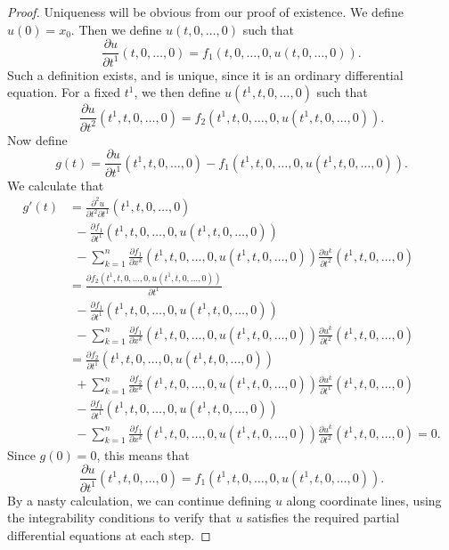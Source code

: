 \begin{proof}
    Uniqueness will be obvious from our proof of existence. We define $u(0) = x_0$. Then we define $u(t,0,\dots,0)$ such that
    \[ \frac{\partial u}{\partial t^1}(t,0,\dots,0) = f_1(t,0,\dots,0,u(t,0,\dots,0)). \]
    Such a definition exists, and is unique, since it is an ordinary differential equation. For a fixed $t^1$, we then define $u(t^1,t,0,\dots,0)$ such that
    \[ \frac{\partial u}{\partial t^2}(t^1,t,0,\dots,0) = f_2(t^1,t,0,\dots,0,u(t^1,t,0,\dots,0)). \]
    Now define
    \[ g(t) = \frac{\partial u}{\partial t^1}(t^1,t,0,\dots,0) - f_1(t^1,t,0,\dots,0,u(t^1,t,0,\dots,0)). \]
    We calculate that
    \begin{align*}
        g'(t) &= \frac{\partial^2 u}{\partial t^2 \partial t^1}(t^1,t,0,\dots,0)\\
        &\ \ - \frac{\partial f_1}{\partial t^1}(t^1,t,0,\dots,0,u(t^1,t,0,\dots,0))\\
        &\ \ - \sum_{k = 1}^n \frac{\partial f_1}{\partial x^k}(t^1,t,0,\dots,0,u(t^1,t,0,\dots,0)) \frac{\partial u^k}{\partial t^2}(t^1,t,0,\dots,0)\\
        &= \frac{\partial f_2(t^1,t,0,\dots,0,u(t^1,t,0,\dots,0))}{\partial t^1}\\
        &\ \ - \frac{\partial f_1}{\partial t^1}(t^1,t,0,\dots,0,u(t^1,t,0,\dots,0))\\
        &\ \ - \sum_{k = 1}^n \frac{\partial f_1}{\partial x^k}(t^1,t,0,\dots,0,u(t^1,t,0,\dots,0)) \frac{\partial u^k}{\partial t^2}(t^1,t,0,\dots,0)\\
        &= \frac{\partial f_2}{\partial t^1}(t^1,t,0,\dots,0,u(t^1,t,0,\dots,0))\\
        &\ \ + \sum_{k = 1}^n \frac{\partial f_2}{\partial x^k}(t^1,t,0,\dots,0,u(t^1,t,0,\dots,0)) \frac{\partial u^k}{\partial t^1}(t^1,t,0,\dots,0)\\
        &\ \ - \frac{\partial f_1}{\partial t^1}(t^1,t,0,\dots,0,u(t^1,t,0,\dots,0))\\
        &\ \ - \sum_{k = 1}^n \frac{\partial f_1}{\partial x^k}(t^1,t,0,\dots,0,u(t^1,t,0,\dots,0)) \frac{\partial u^k}{\partial t^2}(t^1,t,0,\dots,0) = 0.
    \end{align*}
    Since $g(0) = 0$, this means that
    \[ \frac{\partial u}{\partial t^1}(t^1,t,0,\dots,0) = f_1(t^1,t,0,\dots,0,u(t^1,t,0,\dots,0)). \]
    By a nasty calculation, we can continue defining $u$ along coordinate lines, using the integrability conditions to verify that $u$ satisfies the required partial differential equations at each step.
\end{proof}

